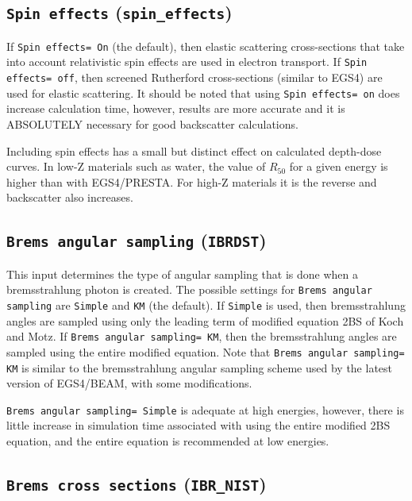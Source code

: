 \documentclass[12pt,twoside]{article}
\begin{document}
\subsection{{\tt Spin effects} ({\tt spin\_effects})}

If {\tt Spin effects= On} (the default), then elastic scattering
cross-sections that take into account relativistic spin effects are used
in electron transport.  If {\tt Spin effects= off},  then
screened Rutherford cross-sections (similar to EGS4) are used for elastic
scattering.  It should be noted that using {\tt Spin effects= on} does
increase calculation time, however, results are more accurate and it
is ABSOLUTELY necessary for good backscatter calculations.

Including spin effects has a small but distinct effect on calculated
depth-dose curves.  In low-Z materials such as water, the value of
$R_{50}$ for a given energy is higher than with EGS4/PRESTA. For high-Z
materials it is the reverse and backscatter also increases.

\subsection{ {\tt Brems angular sampling} ({\tt IBRDST})}
\label{bremssect}

This input determines the type of angular sampling that is done when
a bremsstrahlung photon is created.  The possible settings for
{\tt Brems angular sampling} are {\tt Simple} and {\tt KM} (the default).
If {\tt Simple} is used, then bremsstrahlung angles are sampled using only the leading
term of modified equation 2BS of Koch and Motz\cite{Bi89,KM59}. If
{\tt Brems angular sampling= KM}, then the bremsstrahlung angles are sampled
using the entire modified equation.  Note that {\tt Brems angular sampling= KM}
is similar to the bremsstrahlung angular sampling scheme used by the latest
version of EGS4/BEAM, with some modifications.

{\tt Brems angular sampling= Simple} is adequate at high energies,
however, there is little increase in simulation time associated with using
the entire modified 2BS equation, and the entire equation is recommended
at low energies.

\subsection{ {\tt Brems cross sections} ({\tt IBR\_NIST})}
\end{document}
